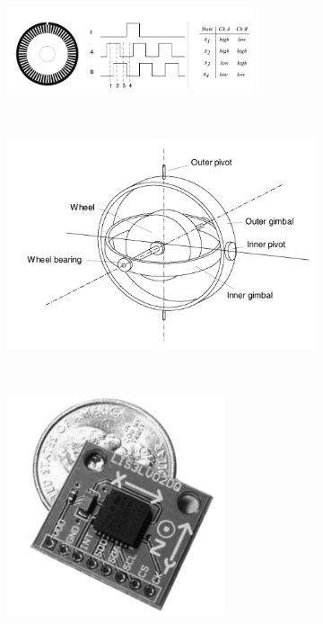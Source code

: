 \begin{figure}[h]
    \centering
    \captionsetup{width=0.8\textwidth,font=footnotesize,textfont=bf}
    \begin{subfigure}[b]{0.8\textwidth}
	\centering
        \includegraphics[width=0.8\textwidth,height=0.6\textheight,keepaspectratio]{figuras/optical.png}
        \caption{\centering \label{fig:optical}}
    \end{subfigure}
    ~
    \begin{subfigure}[b]{0.4\textwidth}
	\centering
        \includegraphics[width=\textwidth,height=\textheight,keepaspectratio]{figuras/giro.png}
        \caption{\centering \label{fig:giro}}
    \end{subfigure}
    ~
    \begin{subfigure}[b]{0.4\textwidth}
	\centering
        \includegraphics[width=0.7\textwidth,height=0.7\textheight,keepaspectratio]{figuras/acel.png}

\end{subfigure}
\end{figure}
